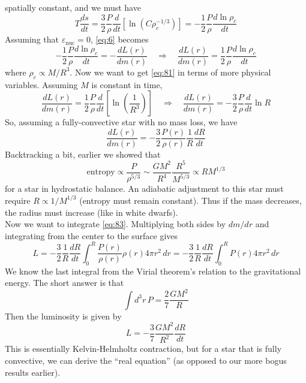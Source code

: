 \documentclass[10pt]{article}
\numberwithin{equation}{section}
\newcommand{\n}{\noindent}
\begin{document}
  spatially constant, and we must have
  \begin{equation}
    \label{eq:80}
    T\frac{ds}{dt}=\frac{3}{2}\frac{P}{\rho}\frac{d}{dt}\left[\ln\left(C
\rho_c^{-1/3}\right)\right]=-\frac{1}{2}\frac{P}{\rho}\frac{d\ln\rho_c}{dt}
  \end{equation}
  Assuming that $\varepsilon_{\mathrm{nuc}}=0$, \eqref{eq:6} becomes
  \begin{equation}
    \label{eq:81}
    -\frac{1}{2}\frac{P}{\rho}\frac{d\ln\rho_c}{dt}=-\frac{dL(r)}{dm(r)}
\quad\Rightarrow\quad \frac{dL(r)}{dm(r)}=\frac{1}{2}\frac{P}{\rho}\frac{d
\ln\rho_c}{dt}
  \end{equation}
  where $\rho_c\propto M/R^3$. Now we want to get \eqref{eq:81} in
  terms of more physical variables. Assuming $M$ is constant in time,
  \begin{equation}
    \label{eq:82}
    \frac{dL(r)}{dm(r)}=\frac{1}{2}\frac{P}{\rho}\frac{d}{dt}\left[\ln\left
(\frac{1}{R^3}\right)\right]\quad\Rightarrow\quad
    \frac{dL(r)}{dm(r)}=-\frac{3}{2}\frac{P}{\rho}\frac{d}{dt}\ln R
  \end{equation}
  So, assuming a fully-convective star with no mass loss, we have
  \begin{equation}
    \label{eq:83}
    \boxed{\frac{dL(r)}{dm(r)}=-\frac{3}{2}\frac{P(r)}{\rho(r)}\frac{1}{R}
\frac{dR}{dt}}
  \end{equation}
  Backtracking a bit, earlier we showed that
  \begin{equation}
    \label{eq:84}
    \mathrm{entropy}\propto \frac{P}{\rho^{5/3}}\sim\frac{GM^2}{R^4}\frac
{R^5}{M^{5/3}}\propto RM^{1/3}
  \end{equation}
  for a star in hydrostatic balance. An adiabatic adjustment to this
  star must require $R\propto 1/M^{1/3}$ (entropy must remain
  constant). Thus if the mass decreases, the radius must increase
  (like in white dwarfs).\\

  \n Now we want to integrate \eqref{eq:83}. Multiplying both sides
  by $dm/dr$ and integrating from the center to the surface gives
  \begin{equation}
    \label{eq:85}
    L=-\frac{3}{2}\frac{1}{R}\frac{dR}{dt}\int_0^R\frac{P(r)}{\rho(r)}\rho
(r)4\pi
    r^2\,dr=-\frac{3}{2}\frac{1}{R}\frac{dR}{dt}\int_0^RP(r)4\pi r^2\,dr
  \end{equation}
  We know the last integral from the Virial theorem's relation to the
  gravitational energy. The short answer is that
  \begin{equation}
    \label{eq:86}
    \int d^3r\,P=\frac{2}{7}\frac{GM^2}{R}
  \end{equation}
  Then the luminosity is given by
  \begin{equation}
    \label{eq:87}
    L=-\frac{3}{7}\frac{GM^2}{R^2}\frac{dR}{dt}
  \end{equation}
  This is essentially Kelvin-Helmholtz contraction, but for a star
  that is fully convective, we can derive the ``real equation'' (as
  opposed to our more bogus results earlier).\\
\end{document}
